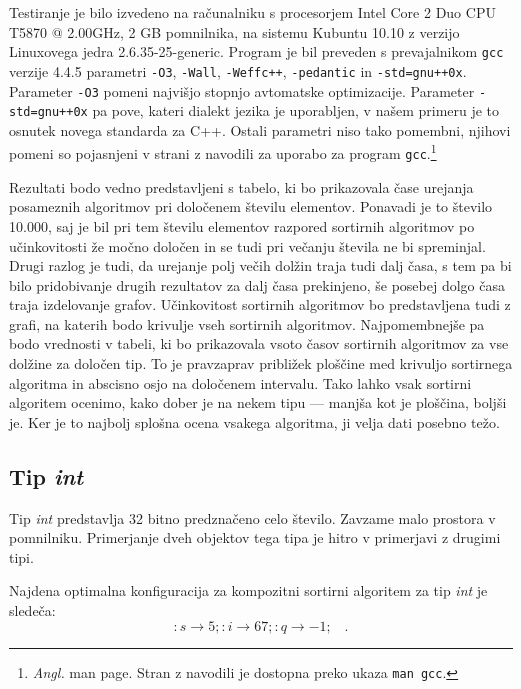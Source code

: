 \documentclass[a4paper,oneside,12pt]{article}
\newcommand{\lra}{\ensuremath{\longrightarrow}}
\newcommand{\edot}{\;\;\;.}
\begin{document}
Testiranje je bilo izvedeno na računalniku s procesorjem Intel\textregistered{} Core\texttrademark{}
2 Duo CPU T5870 @ 2.00GHz, 2 GB pomnilnika, na sistemu Kubuntu 10.10 z verzijo Linuxovega jedra 2.6.35-25-generic.
Program je bil preveden s prevajalnikom \texttt{gcc} verzije 4.4.5 parametri \texttt{-O3},
\texttt{-Wall}, \texttt{-Weffc++}, \texttt{-pedantic} in \texttt{-std=gnu++0x}.
Parameter \texttt{-O3} pomeni najvišjo stopnjo avtomatske optimizacije. Parameter \texttt{-std=gnu++0x} 
pa pove, kateri dialekt jezika je uporabljen, v našem primeru je to osnutek novega standarda za C++.
Ostali parametri niso tako pomembni, njihovi pomeni so pojasnjeni v strani z navodili za uporabo za program 
\texttt{gcc}.\footnote{\emph{Angl.} man page. Stran z navodili je dostopna preko ukaza \texttt{man gcc}.}

Rezultati bodo vedno predstavljeni s tabelo, ki bo prikazovala čase urejanja
posameznih algoritmov pri določenem številu elementov. Ponavadi je to število
10.000, saj je bil pri tem številu elementov razpored sortirnih algoritmov po
učinkovitosti že močno določen in se tudi pri večanju števila ne bi spreminjal.
Drugi razlog je tudi, da urejanje polj večih dolžin traja tudi dalj časa, s tem
pa bi bilo pridobivanje drugih rezultatov za dalj časa prekinjeno, še posebej
dolgo časa traja izdelovanje grafov.
Učinkovitost sortirnih algoritmov bo predstavljena tudi z 
grafi, na katerih bodo krivulje vseh sortirnih algoritmov. Najpomembnejše pa
bodo vrednosti v tabeli, ki bo prikazovala vsoto časov sortirnih algoritmov za
vse dolžine za določen tip. To je pravzaprav približek ploščine med krivuljo sortirnega
algoritma in abscisno osjo na določenem intervalu. Tako lahko vsak sortirni
algoritem ocenimo, kako dober je na nekem tipu --- manjša kot je ploščina, boljši
je. Ker je to najbolj splošna ocena vsakega algoritma, ji velja dati posebno
težo.
\pagebreak

\subsection{Tip \emph{int}}
\label{chapter:rez:int}
Tip \emph{int} predstavlja 32 bitno predznačeno celo število. Zavzame malo prostora v 
pomnilniku. Primerjanje dveh objektov tega tipa je hitro v primerjavi z drugimi tipi.

Najdena optimalna konfiguracija za kompozitni sortirni algoritem za tip \emph{int} je sledeča:
\[ :s \lra 5;:i \lra 67;:q \lra -1; \edot \]
\end{document}
